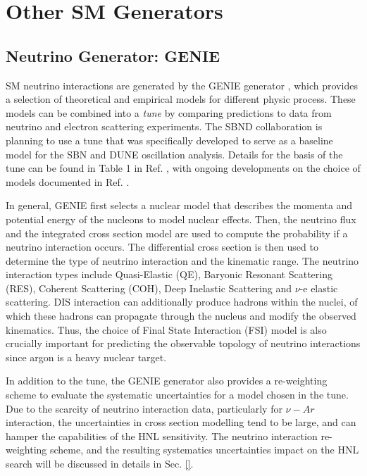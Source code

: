 \section{Other SM Generators}
\label{sec:gen_sm}

\subsection{Neutrino Generator: GENIE}
\label{sec:gen_genie}



SM neutrino interactions are generated by the GENIE generator \cite{genie}, which provides a selection of theoretical and empirical models for different physic process.
These models can be combined into a \textit{tune} by comparing predictions to data from neutrino and electron scattering experiments.
The SBND collaboration is planning to use a tune that was specifically developed to serve as a baseline model for the SBN and DUNE oscillation analysis.
Details for the basis of the tune can be found in Table 1 in Ref. \cite{genie_tune}, with ongoing developments on the choice of models documented in Ref. \cite{genie_tune_github}.  

In general, GENIE first selects a nuclear model that describes the momenta and potential energy of the nucleons to model nuclear effects.
Then, the neutrino flux and the integrated cross section model are used to compute the probability if a neutrino interaction occurs.
The differential cross section is then used to determine the type of neutrino interaction and the kinematic range.
The neutrino interaction types include Quasi-Elastic (QE), Baryonic Resonant Scattering (RES), Coherent Scattering (COH), Deep Inelastic Scattering and $\nu$-e elastic scattering.
DIS interaction can additionally produce hadrons within the nuclei, of which these hadrons can propagate through the nucleus and modify the observed kinematics.
Thus, the choice of Final State Interaction (FSI) model is also crucially important for predicting the observable topology of neutrino interactions since argon is a heavy nuclear target.

In addition to the tune, the GENIE generator also provides a re-weighting scheme to evaluate the systematic uncertainties for a model chosen in the tune.
Due to the scarcity of neutrino interaction data, particularly for $\nu-Ar$ interaction, the uncertainties in cross section modelling tend to be large, and can hamper the capabilities of the HNL sensitivity.  
The neutrino interaction re-weighting scheme, and the resulting systematics uncertainties impact on the HNL search will be discussed in details in Sec. \ref{}.


